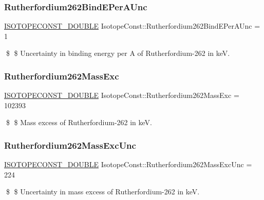 \subsubsection{\texorpdfstring{Rutherfordium262\+Bind\+E\+Per\+A\+Unc}{Rutherfordium262BindEPerAUnc}}
{\footnotesize\ttfamily \mbox{\hyperlink{group___isotope_const-_macros_ga8f45a7272ce02c0b4c65c44636ed719a}{I\+S\+O\+T\+O\+P\+E\+C\+O\+N\+S\+T\+\_\+\+D\+O\+U\+B\+LE}} Isotope\+Const\+::\+Rutherfordium262\+Bind\+E\+Per\+A\+Unc = 1}

\$ \$ Uncertainty in binding energy per A of Rutherfordium-\/262 in keV. \mbox{\label{group___isotope_const-_rutherfordium-_rf262_ga5627378594723b9a9016ae2cc2390154}} 
\subsubsection{\texorpdfstring{Rutherfordium262\+Mass\+Exc}{Rutherfordium262MassExc}}
{\footnotesize\ttfamily \mbox{\hyperlink{group___isotope_const-_macros_ga8f45a7272ce02c0b4c65c44636ed719a}{I\+S\+O\+T\+O\+P\+E\+C\+O\+N\+S\+T\+\_\+\+D\+O\+U\+B\+LE}} Isotope\+Const\+::\+Rutherfordium262\+Mass\+Exc = 102393}

\$ \$ Mass excess of Rutherfordium-\/262 in keV. \mbox{\label{group___isotope_const-_rutherfordium-_rf262_gaaf7fbf5bcbf11cf0e00412c389f35a29}} 
\subsubsection{\texorpdfstring{Rutherfordium262\+Mass\+Exc\+Unc}{Rutherfordium262MassExcUnc}}
{\footnotesize\ttfamily \mbox{\hyperlink{group___isotope_const-_macros_ga8f45a7272ce02c0b4c65c44636ed719a}{I\+S\+O\+T\+O\+P\+E\+C\+O\+N\+S\+T\+\_\+\+D\+O\+U\+B\+LE}} Isotope\+Const\+::\+Rutherfordium262\+Mass\+Exc\+Unc = 224}

\$ \$ Uncertainty in mass excess of Rutherfordium-\/262 in keV. \mbox{\label{group___isotope_const-_rutherfordium-_rf262_gae239dcb2dea76d765d9c0dad6e793565}} 
